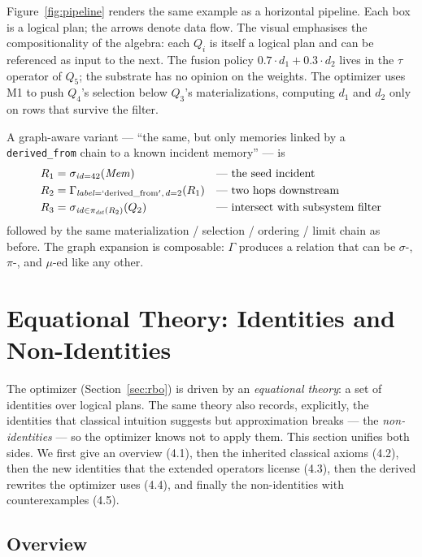 \documentclass[sigconf,nonacm,review]{acmart}
\theoremstyle{plain}
\theoremstyle{definition}
\newcommand{\Mem}{\mathit{Mem}}
\theoremstyle{remark}
\begin{document}
Figure~\ref{fig:pipeline} renders the same example as a horizontal
pipeline. Each box is a logical plan; the arrows denote data flow.
The visual emphasises the compositionality of the algebra: each
$Q_i$ is itself a logical plan and can be referenced as input to
the next. The fusion policy $0.7\cdot d_1 + 0.3\cdot d_2$ lives in
the $\tau$ operator of $Q_5$; the substrate has no opinion on the
weights. The optimizer uses M1 to push $Q_4$'s selection below
$Q_3$'s materializations, computing $d_1$ and $d_2$ only on rows
that survive the filter.

A graph-aware variant --- ``the same, but only memories linked by a
\texttt{derived\_from} chain to a known incident memory'' --- is
\begin{align*}
R_1 &= \sigma_{\mathit{id} = 42}(\Mem) &&\text{--- the seed incident} \\
R_2 &= \Gamma_{\mathit{label}=\mathrm{`derived\_from'},\, d=2}(R_1) &&\text{--- two hops downstream} \\
R_3 &= \sigma_{\mathit{id} \in \pi_{\mathit{dst}}(R_2)}(Q_2) &&\text{--- intersect with subsystem filter}
\end{align*}
followed by the same materialization / selection / ordering / limit
chain as before. The graph expansion is composable: $\Gamma$ produces
a relation that can be $\sigma$-, $\pi$-, and $\mu$-ed like any
other.

\section{Equational Theory: Identities and Non-Identities}\label{sec:equational}

The optimizer (Section~\ref{sec:rbo}) is driven by an
\emph{equational theory}: a set of identities over logical plans.
The same theory also records, explicitly, the identities that
classical intuition suggests but approximation breaks --- the
\emph{non-identities} --- so the optimizer knows not to apply them.
This section unifies both sides. We first give an overview
(4.1), then the inherited classical axioms (4.2), then the new
identities that the extended operators license (4.3), then the
derived rewrites the optimizer uses (4.4), and finally the
non-identities with counterexamples (4.5).

\subsection{Overview}\label{sec:equational:overview}
\end{document}
